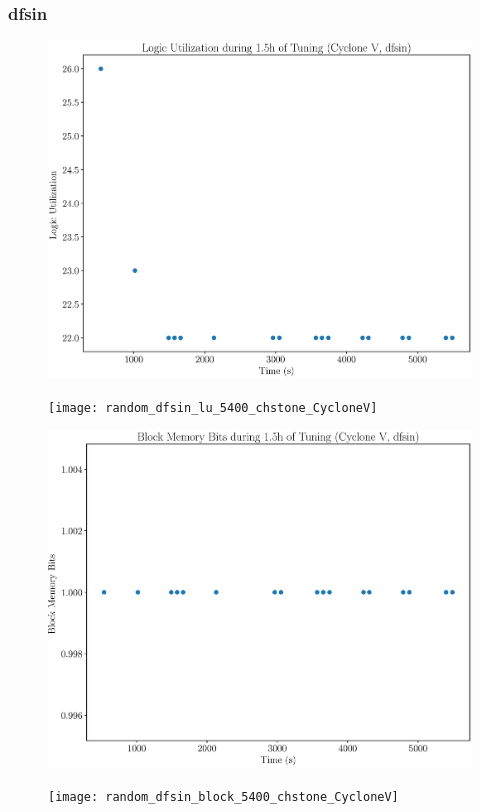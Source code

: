 \documentclass[12pt, a4paper]{article}
\begin{document}
\newpage

\subsubsection{dfsin}

\begin{figure}[htpb]
    \centering
    \noindent
    \begin{minipage}{.48\textwidth}
        \centering
        \includegraphics[scale=.25]{dfsin_lu_5400_chstone_CycloneV}
    \end{minipage}%
    \hfill
    \begin{minipage}{.48\textwidth}
        \centering
        \texttt{[image: random\_dfsin\_lu\_5400\_chstone\_CycloneV]}
    \end{minipage}%

    \begin{minipage}{.48\textwidth}
        \includegraphics[scale=.25]{dfsin_block_5400_chstone_CycloneV}
    \end{minipage}%
    \hfill
    \begin{minipage}{.48\textwidth}
        \texttt{[image: random\_dfsin\_block\_5400\_chstone\_CycloneV]}
    \end{minipage}%


\end{figure}
\end{document}
